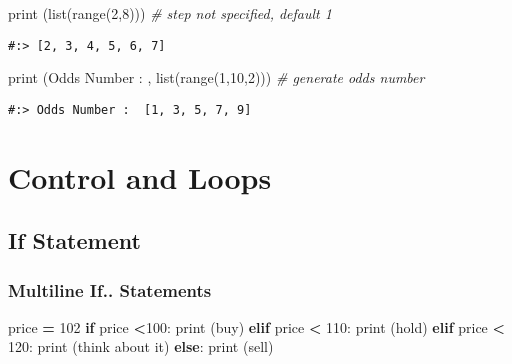 \documentclass[
]{book}
\newenvironment{Shaded}{\begin{snugshade}}{\end{snugshade}}
\newcommand{\BuiltInTok}[1]{#1}
\newcommand{\CommentTok}[1]{\textcolor[rgb]{0.37,0.37,0.37}{\textit{#1}}}
\newcommand{\ControlFlowTok}[1]{\textcolor[rgb]{0.27,0.27,0.27}{\textbf{#1}}}
\newcommand{\DecValTok}[1]{\textcolor[rgb]{0.06,0.06,0.06}{#1}}
\newcommand{\NormalTok}[1]{#1}
\newcommand{\OperatorTok}[1]{\textcolor[rgb]{0.43,0.43,0.43}{\textbf{#1}}}
\newcommand{\StringTok}[1]{\textcolor[rgb]{0.5,0.5,0.5}{#1}}
\begin{document}
\begin{Shaded}
\begin{Highlighting}[]
\BuiltInTok{print}\NormalTok{ (}\BuiltInTok{list}\NormalTok{(}\BuiltInTok{range}\NormalTok{(}\DecValTok{2}\NormalTok{,}\DecValTok{8}\NormalTok{)))    }\CommentTok{\# step not specified, default 1}
\end{Highlighting}
\end{Shaded}

\begin{verbatim}
#:> [2, 3, 4, 5, 6, 7]
\end{verbatim}

\begin{Shaded}
\begin{Highlighting}[]
\BuiltInTok{print}\NormalTok{ (}\StringTok{\textquotesingle{}Odds Number : \textquotesingle{}}\NormalTok{ , }\BuiltInTok{list}\NormalTok{(}\BuiltInTok{range}\NormalTok{(}\DecValTok{1}\NormalTok{,}\DecValTok{10}\NormalTok{,}\DecValTok{2}\NormalTok{))) }\CommentTok{\# generate odds number}
\end{Highlighting}
\end{Shaded}

\begin{verbatim}
#:> Odds Number :  [1, 3, 5, 7, 9]
\end{verbatim}

\hypertarget{control-and-loops}{%
\chapter{Control and Loops}\label{control-and-loops}}

\hypertarget{if-statement}{%
\section{If Statement}\label{if-statement}}

\hypertarget{multiline-if..-statements}{%
\subsection{Multiline If.. Statements}\label{multiline-if..-statements}}

\begin{Shaded}
\begin{Highlighting}[]
\NormalTok{price }\OperatorTok{=} \DecValTok{102}
\ControlFlowTok{if}\NormalTok{ price }\OperatorTok{\textless{}}\DecValTok{100}\NormalTok{:}
    \BuiltInTok{print}\NormalTok{ (}\StringTok{\textquotesingle{}buy\textquotesingle{}}\NormalTok{)}
\ControlFlowTok{elif}\NormalTok{ price }\OperatorTok{\textless{}} \DecValTok{110}\NormalTok{:}
    \BuiltInTok{print}\NormalTok{ (}\StringTok{\textquotesingle{}hold\textquotesingle{}}\NormalTok{)}
\ControlFlowTok{elif}\NormalTok{ price }\OperatorTok{\textless{}} \DecValTok{120}\NormalTok{:}
    \BuiltInTok{print}\NormalTok{ (}\StringTok{\textquotesingle{}think about it\textquotesingle{}}\NormalTok{)}
\ControlFlowTok{else}\NormalTok{:}
    \BuiltInTok{print}\NormalTok{ (}\StringTok{\textquotesingle{}sell\textquotesingle{}}\NormalTok{)}
\end{Highlighting}
\end{Shaded}
\end{document}
